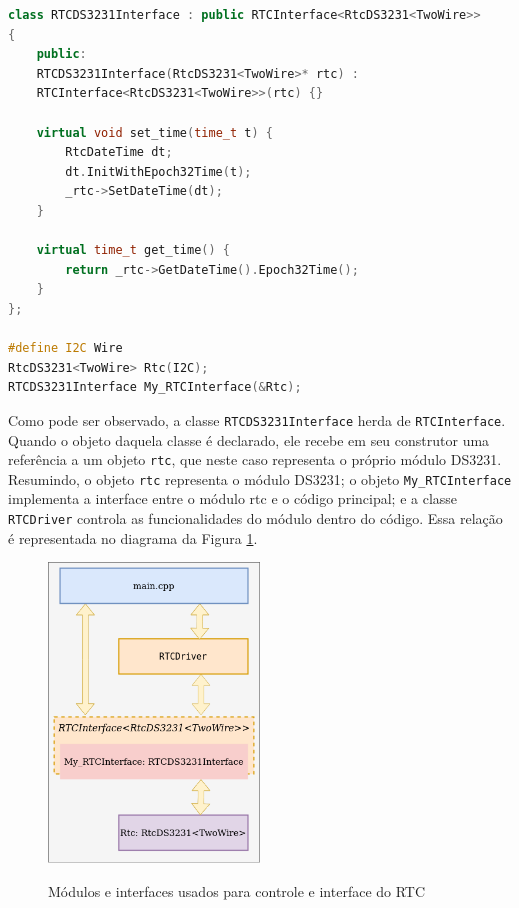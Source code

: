\begin{lstlisting}[language=C++]
class RTCDS3231Interface : public RTCInterface<RtcDS3231<TwoWire>>
{
    public:
    RTCDS3231Interface(RtcDS3231<TwoWire>* rtc) : 
    RTCInterface<RtcDS3231<TwoWire>>(rtc) {}
    
    virtual void set_time(time_t t) {
        RtcDateTime dt;
        dt.InitWithEpoch32Time(t);
        _rtc->SetDateTime(dt);
    }
    
    virtual time_t get_time() {
        return _rtc->GetDateTime().Epoch32Time();
    }
};

#define I2C Wire
RtcDS3231<TwoWire> Rtc(I2C);
RTCDS3231Interface My_RTCInterface(&Rtc);
\end{lstlisting}

Como pode ser observado, a classe \texttt{RTCDS3231Interface} herda de \texttt{RTCInterface}. Quando o objeto daquela classe é declarado, ele recebe em seu construtor uma referência a um objeto \texttt{rtc}, que neste caso representa o próprio módulo DS3231. Resumindo, o objeto \texttt{rtc} representa o módulo DS3231; o objeto \texttt{My\_RTCInterface} implementa a interface entre o módulo \acrshort{rtc} e o código principal; e a classe \texttt{RTCDriver} controla as funcionalidades do módulo dentro do código. Essa relação é representada no diagrama da Figura \ref{fig:rtc-classes}.

\begin{figure}[h]
    \centering
    \caption{Módulos e interfaces usados para controle e interface do RTC}
    \includegraphics[width=0.5\textwidth]{aftertext/Firmware/Figuras/Diagrama-de-modulos-RTC.png}
    \label{fig:rtc-classes}
\end{figure}

